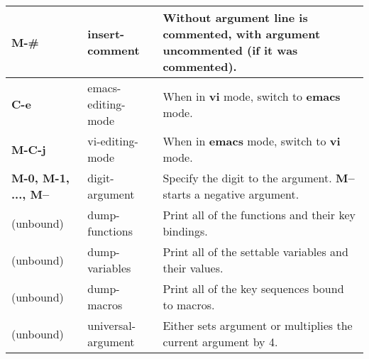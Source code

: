 \documentclass{article}
\begin{document}
\begin{tabular}{|p{3.5cm}|p{4cm}|p{10cm}|}
\hline
\textbf{M-\#} & insert-comment & Without argument line is commented, with argument uncommented (if it was commented). \\
\hline
\textbf{C-e} & emacs-editing-mode & When in \textbf{vi} mode, switch to \textbf{emacs} mode. \\
\hline
\textbf{M-C-j} & vi-editing-mode & When in \textbf{emacs} mode, switch to \textbf{vi} mode. \\
\hline
\textbf{M-0, M-1, ..., M--} & digit-argument & Specify the digit to the argument. \textbf{M--} starts a negative argument. \\
\hline
(unbound) & dump-functions & Print all of the functions and their key bindings. \\
(unbound) & dump-variables & Print all of the settable variables and their values. \\
(unbound) & dump-macros & Print all of the key sequences bound to macros. \\
(unbound) & universal-argument & Either sets argument or multiplies the current argument by 4. \\
\hline
\end{tabular}

\vfill

\end{document}
